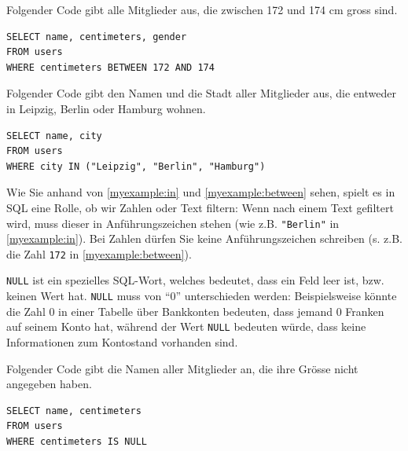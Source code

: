 \begin{myexample}\label{myexample:between}
Folgender Code gibt alle Mitglieder aus, die zwischen 172 und 174 cm gross sind.

\begin{lstlisting}[style=sql]
SELECT name, centimeters, gender 
FROM users 
WHERE centimeters BETWEEN 172 AND 174 
\end{lstlisting}
\end{myexample}

\begin{myexample}\label{myexample:in}
Folgender Code gibt den Namen und die Stadt aller Mitglieder aus, die entweder in Leipzig, Berlin oder Hamburg wohnen.

\begin{lstlisting}[style=sql]
SELECT name, city
FROM users 
WHERE city IN ("Leipzig", "Berlin", "Hamburg")
\end{lstlisting}
\end{myexample}


\begin{mycaution}
  Wie Sie anhand von \cref{myexample:in} und \cref{myexample:between} sehen, spielt es in SQL eine Rolle, ob  wir Zahlen oder
  Text filtern: Wenn nach einem Text gefiltert wird, muss dieser in Anführungszeichen stehen (wie z.B.
  \lstinline[style=sql]|"Berlin"| in \cref{myexample:in}). Bei Zahlen dürfen Sie keine Anführungszeichen schreiben (s. z.B. die Zahl
  \lstinline[style=sql]|172| in \cref{myexample:between}).
\end{mycaution}

\lstinline[style=sql]|NULL| ist ein spezielles \gls{SQL}-Wort, welches bedeutet, dass ein Feld leer ist, bzw. keinen
Wert hat. \lstinline[style=sql]|NULL| muss von \enquote{0} unterschieden werden: Beispielsweise könnte die Zahl 0 in einer 
Tabelle über Bankkonten bedeuten, dass jemand 0 Franken auf seinem Konto hat, während der Wert \lstinline[style=sql]|NULL| bedeuten würde, dass keine 
Informationen zum Kontostand vorhanden sind.

\begin{myexample}
  Folgender Code gibt die Namen aller Mitglieder an, die ihre Grösse nicht angegeben haben.
\begin{lstlisting}[style=sql]
SELECT name, centimeters
FROM users 
WHERE centimeters IS NULL
\end{lstlisting}
\end{myexample}


